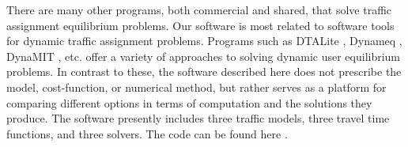 There are many other programs, both commercial and shared, that solve traffic assignment equilibrium problems. Our software is most related to software tools for dynamic traffic assignment problems. Programs such as 
DTALite \cite{zhou2014dtalite}, 
Dynameq \cite{mahut2010traffic}, 
DynaMIT \cite{DynaMIT, ben2001dynamit}, 
etc. offer a variety of approaches to solving dynamic user equilibrium problems. In contrast to these, the software described here does not prescribe the model, cost-function, or numerical method, but rather serves as a platform for comparing different options in terms of computation and the solutions they produce. The software presently includes three traffic models, three travel time functions, and three solvers.
The code can be found here \cite{ta_solver}. 

